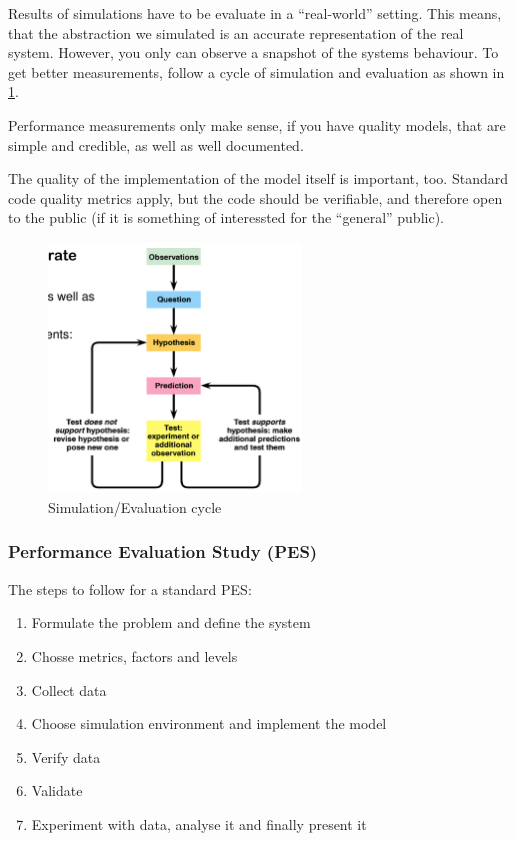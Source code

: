 \documentclass[english]{panikzettel}
\begin{document}
	\begin{halfboxl}
		Results of simulations have to be evaluate in a \enquote{real-world} setting. 	
		This means, that the abstraction we simulated is an accurate representation of the real system.
		However, you only can observe a snapshot of the systems behaviour. 
		To get better measurements, follow a cycle of simulation and evaluation as shown in \cref{img-5-scientific-method}.

		Performance measurements only make sense, if you have quality models, that are simple and credible, as well as well documented.

		The quality of the implementation of the model itself is important, too.
		Standard code quality metrics apply, but the code should be verifiable, and therefore open to the public (if it is something of interessted for the \enquote{general}	public).

	\end{halfboxl}%
	\begin{halfboxr}
		\vspace{-\baselineskip}
		\begin{figure}[H]
			\centering
			\includegraphics[width=0.6\textwidth]{img/5-scientific-method.png}
			\caption{Simulation/Evaluation cycle}
			\label{img-5-scientific-method}
		\end{figure}
	\end{halfboxr}

	\subsubsection{Performance Evaluation Study (PES)}
	\label{sss:performance-evaluation-using-des:performance-evaluation-study-(pes)}
	
	The steps to follow for a standard PES:
	\begin{enumerate}
		\item Formulate the problem and define the system
		\item Chosse metrics, factors and levels
		\item Collect data 
		\item Choose simulation environment and implement the model
		\item Verify data
		\item Validate 
		\item Experiment with data, analyse it and finally present it
	\end{enumerate}
\end{document}
